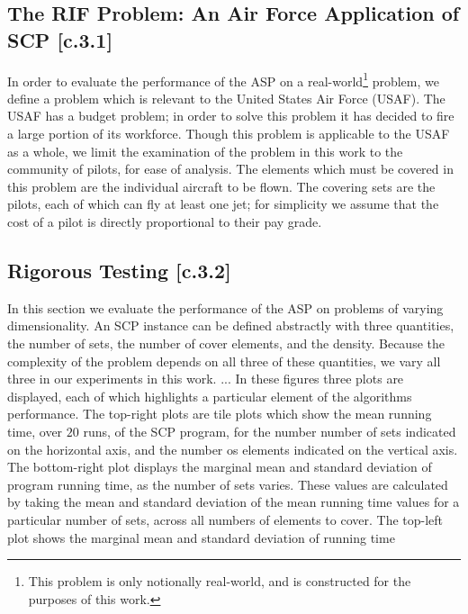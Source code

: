\documentclass[12pt]{article}
\begin{document}
\subsection{The RIF Problem: An Air Force Application of SCP [c.3.1]} \label{scn:testing_usaf}

In order to evaluate the performance of the ASP on a real-world\footnote{This problem is only notionally real-world, and is constructed for the purposes of this work.} problem, we define a problem which is relevant to the United States Air Force (USAF). The USAF has a budget problem; in order to solve this problem it has decided to fire a large portion of its workforce. Though this problem is applicable to the USAF as a whole, we limit the examination of the problem in this work to the community of pilots, for ease of analysis. The elements which must be covered in this problem are the individual aircraft to be flown. The covering sets are the pilots, each of which can fly at least one jet; for simplicity we assume that the cost of a pilot is directly proportional to their pay grade. 

\subsection{Rigorous Testing [c.3.2]} \label{scn:testing_complete}

In this section we evaluate the performance of the ASP on problems of varying dimensionality. An SCP instance can be defined abstractly with three quantities, the number of sets, the number of cover elements, and the density. Because the complexity of the problem depends on all three of these quantities, we vary all three in our experiments in this work. 
... In these figures three plots are displayed, each of which highlights a particular element of the algorithms performance. The top-right plots are tile plots which show the mean running time, over $20$ runs, of the SCP program, for the number number of sets indicated on the horizontal axis, and the number os elements indicated on the vertical axis. The bottom-right plot displays the marginal mean and standard deviation of program running time, as the number of sets varies. These values are calculated by taking the mean and standard deviation of the mean running time values for a particular number of sets, across all numbers of elements to cover. The top-left plot shows the marginal mean and standard deviation of running time


\pagebreak




\end{document}
